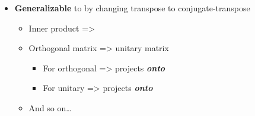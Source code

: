 \begin{itemize}
        \begin{itemize}

          \item
                 is \textbf{orthogonal}, i.e.~, so
                its a basis transformation
          \item
                ,
                are {[}{[}tutorial 1\#Projection properties\textbar orthogonal
                projections{]}{]} \textbf{onto} ,
                 \emph{respectively}
          \item
                Notice:
        \end{itemize}
  \item
        \textbf{Generalizable} to  by
        changing transpose to conjugate-transpose

        \begin{itemize}

          \item
                Inner product  =\textgreater{} 
          \item
                Orthogonal matrix  =\textgreater{} unitary
                matrix 

                \begin{itemize}

                  \item
                        For orthogonal
                        =\textgreater{}  projects
                        \textbf{\emph{onto}} 
                  \item
                        For unitary
                        =\textgreater{} 
                        projects \textbf{\emph{onto}} 
                \end{itemize}
          \item
                And so on\ldots{}
        \end{itemize}
\end{itemize}

